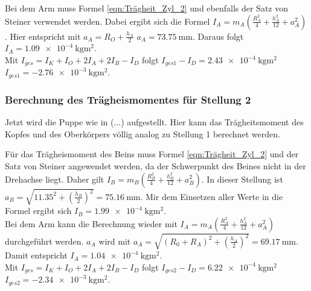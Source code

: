     Bei dem Arm muss Formel \ref{eqn:Trägheit_Zyl_2} und ebenfalls der Satz von Steiner verwendet werden.
    Dabei ergibt sich die Formel $I_A=m_A(\frac{R_A^2}{4}+\frac{h_A^2}{12}+a_A^2)$.
    Hier entspricht mit $a_A=R_O+\frac{h_A}{2}$ \; $a_A=\qty{73.75}{\milli\meter}$.
    Daraus folgt $I_A=\qty{1.09e-4}{\kilo\gram\meter\squared}$.\\
    
    Mit $I_{ges}=I_K+I_O+2I_A+2I_B-I_D$ folgt $I_{ges1}-I_D=\qty{2.43e-4}{\kilo\gram\meter\squared}$ \\
     $I_{ges1}=\qty{-2.76e-3}{\kilo\gram\meter\squared}$.

    \subsubsection{Berechnung des Trägheismomentes für Stellung 2}
    Jetzt wird die Puppe wie in (...) aufgestellt.%
    Hier kann das Trägheitsmoment des Kopfes und des Oberkörpers völlig analog zu Stellung 1 berechnet werden.
    
    Für das Trägheismoment des Beins muss Formel \ref{eqn:Trägheit_Zyl_2} und der Satz von Steiner angewendet werden, da der  Schwerpunkt des Beines nicht in der Drehachse liegt.
    Daher gilt $I_B=m_B(\frac{R_B^2}{4}+\frac{h_B^2}{12}+a_B^2)$.
    In dieser Stellung ist $a_B=\sqrt{11.35^2+(\frac{h_B}{2})^2}=\qty{75.16}{\milli\meter}$.
    Mir dem Einsetzen aller Werte in die Formel ergibt sich $I_B=\qty{1.99e-4}{\kilo\gram\meter\squared}$.\\

    Bei dem Arm kann die Berechnung wieder mit $I_A=m_A(\frac{R_A^2}{4}+\frac{h_A^2}{12}+a_A^2)$ durchgeführt werden.
    $a_A$ wird mit $a_A=\sqrt{(R_0+R_A)^2+(\frac{h_A}{2})^2}=\qty{69.17}{\milli\meter}$.
    Damit entspricht $I_A=\qty{1.04e-4}{\kilo\gram\meter\squared}$.\\
    
    Mit $I_{ges}=I_K+I_O+2I_A+2I_B-I_D$ folgt $I_{ges2}-I_D=\qty{6.22e-4}{\kilo\gram\meter\squared}$ \\
     $I_{ges2}=\qty{-2.34e-3}{\kilo\gram\meter\squared}$.





    
    

    

    
